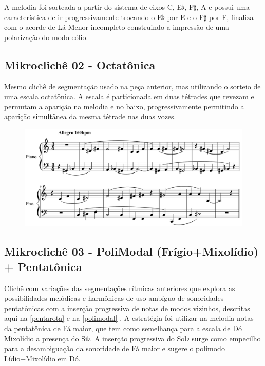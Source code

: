 \documentclass[
	12pt,				%
	openright,			%
	twoside,			%
	a4paper,			%
	english,			%
	french,				%
	spanish,			%
	brazil				%
	]{abntex2}
\begin{document}
A melodia foi sorteada a partir do sistema de eixos C, E$\flat$, F$\sharp$, A e possui uma característica de ir progressivamente trocando o E$\flat$ por E e o F$\sharp$ por F, finaliza com o acorde de Lá Menor incompleto construindo a impressão de uma polarização do modo eólio.

\subsection{Mikroclichê 02 - Octatônica}

Mesmo clichê de segmentação usado na peça anterior, mas utilizando o sorteio de uma escala octatônica. A escala é particionada em duas tétrades que revezam e permutam a aparição na melodia e no baixo, progressivamente permitindo a aparição simultânea da mesma tétrade nas duas vozes.

\begin{figure}[!h]
	\begin{center}
	    \includegraphics*[scale=0.4]{score/MikroCliche02.png}
	\end{center}
\end{figure}

\subsection{Mikroclichê 03 - PoliModal (Frígio+Mixolídio) + Pentatônica}

Clichê com variações das segmentações rítmicas anteriores que explora as possibilidades melódicas e harmônicas de uso ambíguo de sonoridades pentatônicas com a inserção progressiva de notas de modos vizinhos, descritas aqui na \autoref{pentarota} e na \autoref{polimodal} . A estratégia foi utilizar na melodia notas da pentatônica de Fá maior, que tem como semelhança para a escala de Dó Mixolídio a presença do Si$\flat$. A inserção progressiva do Sol$\flat$ surge como empecilho para a desambiguação da sonoridade de Fá maior e sugere o polimodo Lídio+Mixolídio em Dó.
\end{document}
